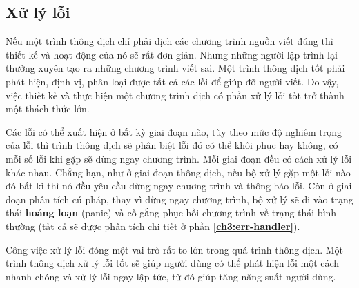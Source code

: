 \subsection{Xử lý lỗi}
    Nếu một trình thông dịch chỉ phải dịch các chương trình nguồn viết đúng thì thiết kế và hoạt động của nó sẽ rất đơn giản. Nhưng những người lập trình lại thường xuyên tạo ra những chương trình viết sai. Một trình thông dịch tốt phải phát hiện, định vị, phân loại được tất cả các lỗi để giúp đỡ người viết. Do vậy, việc thiết kế và thực hiện một chương trình dịch có phần xử lý lỗi tốt trở thành một thách thức lớn.

    Các lỗi có thể xuất hiện ở bất kỳ giai đoạn nào, tùy theo mức độ nghiêm trọng của lỗi thì trình thông dịch sẽ phân biệt lỗi đó có thể khôi phục hay không, có mỗi số lỗi khi gặp sẽ dừng ngay chương trình. Mỗi giai đoạn đều có cách xử lý lỗi khác nhau. Chẳng hạn, như ở giai đoạn thông dịch, nếu bộ xử lý gặp một lỗi nào đó bất kì thì nó đều yêu cầu dừng ngay chương trình và thông báo lỗi. Còn ở giai đoạn phân tích cú pháp, thay vì dừng ngay chương trình, bộ xử lý sẽ đi vào trạng thái \textbf{hoảng loạn} (panic) và cố gắng phục hồi chương trình về trạng thái bình thường (tất cả sẽ được phân tích chi tiết ở phần \textbf{\ref{ch3:err-handler}}).

    Công việc xử lý lỗi đóng một vai trò rất to lớn trong quá trình thông dịch. Một trình thông dịch xử lý lỗi tốt sẽ giúp người dùng có thể phát hiện lỗi một cách nhanh chóng và xử lý lỗi ngay lập tức, từ đó giúp tăng năng suất người dùng. 
